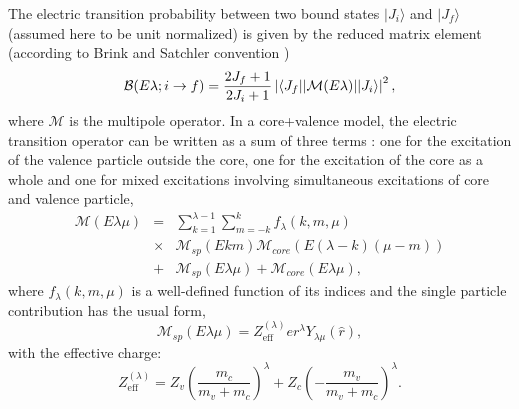 \documentclass[preprint,12pt]{elsarticle}
\begin{document}
The electric transition probability between two bound states $| J_i
\rangle$ and $| J_f \rangle$ (assumed here to be unit normalized) 
 is given by the reduced matrix element (according to Brink and Satchler convention \cite{BS}) 
\begin{equation}
 \label{bediscgen}
{\cal B}(E\lambda; i \to f)=\frac{2 J_f+1}{2 J_i+1}\left | 
\langle J_f || \mathcal{M}(E\lambda) || J_i \rangle      \right |^2    ,
\end{equation}
where $\mathcal{M}$ is the multipole operator. In a core+valence
model, the electric transition operator can be written  
as a sum of three terms \cite{lay10a}: one for the excitation of the valence
particle outside the core, one for the excitation of the core as a
whole and one for mixed excitations involving simultaneous excitations
of core and valence particle, 
\begin{eqnarray}
\label{mel}
\mathcal{M}(E\lambda \mu) & = &   \sum_{k=1}^{\lambda-1}\sum_{m=-k}^{k}f_{\lambda}(k,m,\mu) 
\nonumber \\
&\times & \mathcal{M}_{sp}(E k m)  \mathcal{M}_{core}(E(\lambda-k) (\mu-m) )  \nonumber \\    
  &+ &  \mathcal{M}_{sp}(E\lambda \mu)  + \mathcal{M}_{core}(E\lambda\mu)  ,    
\end{eqnarray}
where $f_{\lambda}(k,m,\mu)$ is a well-defined function of its indices and the single particle contribution has the usual form,
\begin{equation}
\mathcal{M}_{sp}(E\lambda \mu)= Z_\mathrm{eff}^{(\lambda)} e r^\lambda
Y_{\lambda \mu}(\hat{r}), 
\end{equation}
with the effective charge:
\begin{equation}
Z_\mathrm{eff}^{(\lambda)}=Z_v
\left(\frac{m_c}{m_v+m_c}\right)^\lambda + Z_c
\left(-\frac{m_v}{m_v+m_c}\right)^\lambda . 
\end{equation}
\begin{comment}
In the test case presented in this work, $^{11}$Be, the core states
will be restricted to the ground state ($0^+$) and the first excited  
state ($2^+$). Consequently, dipole transitions will consist of pure
single particle excitations. On the other hand, quadrupole transitions
will contain both single particle and core excitations, but not
simultaneous  transitions. These  simultaneous transitions will only
affect octupole and higher order transitions, which will not be
considered here. The same argument applies to many other  
nuclei of interest, consisting of a even-even core plus one extra
particle.  
\end{comment}
\end{document}
